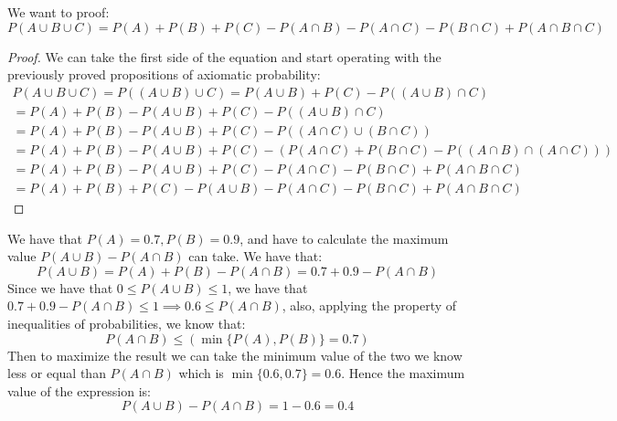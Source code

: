 \documentclass{article}
\begin{document}
    \begin{minipage}{\linewidth}
        \begin{solutions}
            We want to proof: 
            \[
                P(A \cup B \cup C) = P(A) + P(B) + P(C) - P(A \cap B) - P(A \cap C) - P(B \cap C) + P(A \cap B \cap C)
            \]
            \begin{proof}
                We can take the first side of the equation and start operating with the previously proved propositions of axiomatic probability: 
                \begin{gather*}
                    P(A \cup B \cup C) = P((A \cup B) \cup C) = P(A \cup B) + P(C) - P((A \cup B) \cap C)\\ 
                    = P(A) + P(B) - P(A \cup B) + P(C) - P((A \cup B) \cap C)\\
                    = P(A) + P(B) - P(A \cup B) + P(C) - P((A \cap C) \cup (B \cap C))\\
                    = P(A) + P(B) - P(A \cup B) + P(C) - (P(A \cap C) + P(B \cap C) - P((A \cap B) \cap (A \cap C)))\\
                    = P(A) + P(B) - P(A \cup B) + P(C) - P(A \cap C) - P(B \cap C) + P(A \cap B \cap C)\\
                    = P(A) + P(B) + P(C)- P(A \cup B) - P(A \cap C) - P(B \cap C) + P(A \cap B \cap C)
                \end{gather*}
            \end{proof}
            \medskip
        \end{solutions}
    \end{minipage}
    \begin{minipage}{\linewidth}
        \begin{solutions}
            We have that $P(A) = 0.7, P(B) = 0.9$, and have to calculate the maximum value $P(A \cup B) - P(A \cap B)$ can take. 
            We have that:
            \[
                P(A \cup B) = P(A) + P(B) - P(A \cap B) = 0.7 + 0.9 - P(A \cap B)
            \]
            Since we have that $0 \leq P(A \cup B) \leq 1$, we have that $0.7 + 0.9 - P(A \cap B) \leq 1 \implies 0.6 \leq P(A \cap B)$, also, applying the property of inequalities of probabilities, we know that:
            \[
                P(A \cap B) \leq (\min{\{P(A), P(B)\}} = 0.7)
            \]
            Then to maximize the result we can take the minimum value of the two we know less or equal than $P(A \cap B)$ which is $\min{\{0.6, 0.7\}} = 0.6$. Hence the maximum value of the expression is:
            \[
                P(A \cup B) - P(A \cap B) = 1 - 0.6 = 0.4
            \]
            \medskip
        \end{solutions}
    \end{minipage}
\end{document}
